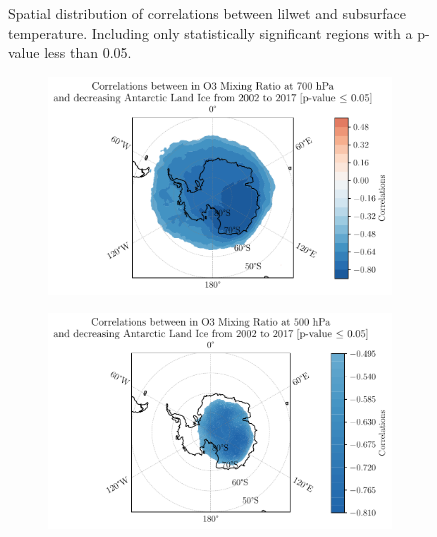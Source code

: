 \documentclass[../main.tex]{subfiles}
\begin{document}
\begin{figure}[hbt!]
\begin{subfigure}[b]{0.45\textwidth}
    \end{subfigure}
    \caption{Spatial distribution of correlations between \gls{lilwet} and subsurface temperature. Including only statistically significant regions with a p-value less than 0.05.}
    \label{fig:correlation_spatial_subsurtemp_100}
\end{figure}
\begin{figure}[hbt!]
    \centering
    \begin{subfigure}[b]{0.45\textwidth}
    \includegraphics[width=\textwidth]{images/2021w5/chapter7/hres/decreasing_correlation_spatial_o3_700}
    \end{subfigure}
    \begin{subfigure}[b]{0.45\textwidth}
    \includegraphics[width=\textwidth]{images/2021w5/chapter7/hres/decreasing_correlation_spatial_o3_500}
    \end{subfigure}
    \begin{subfigure}[b]{0.45\textwidth}

\end{subfigure}
\end{figure}
\end{document}
